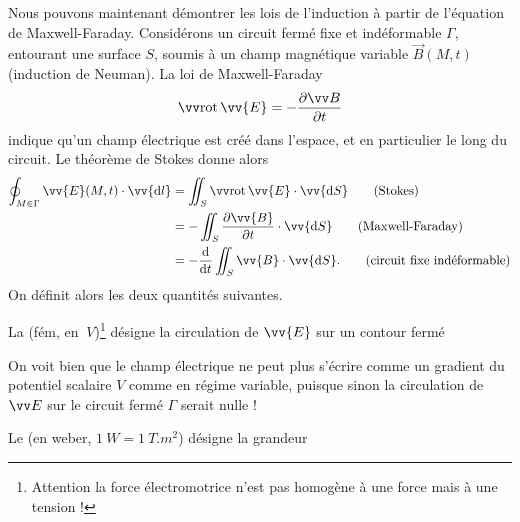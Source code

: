 \documentclass[12pt,fancy]{cours}
\begin{document}
Nous pouvons maintenant démontrer les lois de l’induction à partir de l’équation de Maxwell-Faraday. Considérons un circuit fermé fixe et indéformable $\Gamma$, entourant une surface $S$, soumis à un champ magnétique variable $\Vec{B}(M,t)$ (induction de Neuman). La loi de Maxwell-Faraday
\begin{equation}
\rot{\vv{E}} = -\dr{\Vec{B}}{t}
\end{equation}
indique qu’un champ électrique est créé dans l’espace, et en particulier le long du circuit. Le théorème de Stokes donne alors
\begin{align}
\oint_{M\in\Gamma}\vv{E}(M,t)\cdot\vv{\d l}& =\iint_{S}\rot{\vv{E}}\cdot\vv{\d S} \tag{Stokes}\\
&=-\iint_{S}\frac{\partial\vv{B}}{\partial t}\cdot\vv{\d S} \tag{Maxwell-Faraday} \\
&=-\frac{\d}{\d t}\iint_{S}\vv{B}\cdot\vv{\d S}. \tag{circuit fixe indéformable}
\end{align}
On définit alors les deux quantités suivantes.
\begin{liste}
\item La  (fém, en $\SI{}{V}$)\footnote{Attention la force électromotrice n’est pas homogène à une force mais à une tension !} désigne la circulation de $\vv{E}$ sur un contour fermé
\begin{remarque}
  On voit bien que le champ électrique ne peut plus s'écrire comme un gradient du potentiel scalaire $V$ comme en régime variable, puisque sinon la circulation de $\E$ sur le circuit fermé $\Gamma$ serait nulle !
\end{remarque}
\item Le   (en weber, $\SI{1}{W} = \SI{1}{T.m^2}$) désigne la grandeur
\end{liste}
\end{document}
